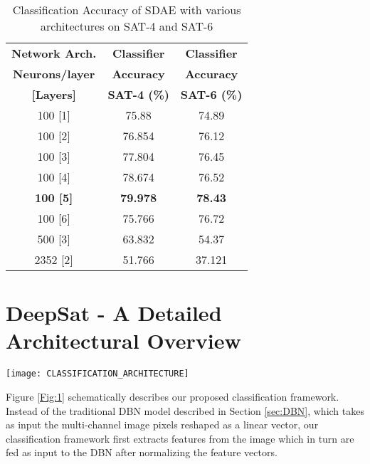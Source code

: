 \documentclass[11pt,a4paper]{article}
\begin{document}
\begin{table}[h]
\centering
\begin{tabular}{ | c | c | c | }
    \hline
     \textbf{Network Arch.} & \textbf{Classifier} & \textbf{Classifier}\\ 
    \textbf{Neurons/layer} &   \textbf{Accuracy} & \textbf{Accuracy} \\ 
    \textbf{[Layers]} & \textbf{SAT-4 (\%)} & \textbf{SAT-6 (\%)} \\ \hline
    100 [1] & 75.88  & 74.89 \\ \hline
    100 [2] & 76.854 & 76.12 \\ \hline
    100 [3] & 77.804 & 76.45  \\ \hline
    100 [4] & 78.674 & 76.52  \\ \hline
    \textbf{100 [5]} & \textbf{79.978} & \textbf{78.43} \\ \hline
    100 [6] & 75.766 & 76.72  \\ \hline
    500 [3] & 63.832 & 54.37 \\ \hline
    2352 [2] & 51.766 & 37.121 \\ \hline
  \end{tabular}
  \caption{Classification Accuracy of SDAE with various architectures on SAT-4 and SAT-6}
  \label{table:SAE_accuracy_SAT_4_and_SAT_6}
\end{table}


\section{DeepSat - A Detailed \\
Architectural Overview}
\begin{figure*}
  \centering
    \texttt{[image: CLASSIFICATION\_ARCHITECTURE]}
  \caption{Schematic of the DeepSat classification framework} \label{Fig:1}
\end{figure*}
Figure \ref{Fig:1} schematically describes our proposed classification framework. Instead of the traditional DBN model described in Section \ref{sec:DBN}, which takes as input the multi-channel image pixels reshaped as a linear vector, our classification framework first extracts features from the image which in turn are fed as input to the DBN after normalizing the feature vectors.
\end{document}
